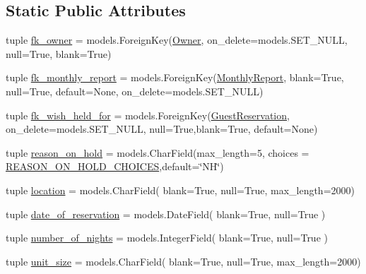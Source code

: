 \subsection*{Static Public Attributes}
\begin{DoxyCompactItemize}
\item 
tuple \hyperlink{classreservation__manager_1_1models_1_1Reservation_ad460f0ba3d784f28324085882a2246b8}{fk\-\_\-owner} = models.\-Foreign\-Key(\hyperlink{classreservation__manager_1_1models_1_1Owner}{Owner}, on\-\_\-delete=models.\-S\-E\-T\-\_\-\-N\-U\-L\-L, null=True, blank=True)
\item 
tuple \hyperlink{classreservation__manager_1_1models_1_1Reservation_ac21f0b3528f8e3ba53c3e24231a303cc}{fk\-\_\-monthly\-\_\-report} = models.\-Foreign\-Key(\hyperlink{classmonthly__summary_1_1models_1_1MonthlyReport}{Monthly\-Report}, blank=True, null=True, default=None, on\-\_\-delete=models.\-S\-E\-T\-\_\-\-N\-U\-L\-L)
\item 
tuple \hyperlink{classreservation__manager_1_1models_1_1Reservation_a0fc4a0b1a628c9d2eadbe57632be4387}{fk\-\_\-wish\-\_\-held\-\_\-for} = models.\-Foreign\-Key(\hyperlink{classguest__reservation__manager_1_1models_1_1GuestReservation}{Guest\-Reservation}, on\-\_\-delete=models.\-S\-E\-T\-\_\-\-N\-U\-L\-L, null=True,blank=True, default=None)
\item 
tuple \hyperlink{classreservation__manager_1_1models_1_1Reservation_a05bba6cb6791c1aadf552795174c1be7}{reason\-\_\-on\-\_\-hold} = models.\-Char\-Field(max\-\_\-length=5, choices = \hyperlink{namespacereservation__manager_1_1models_a435b3782f874d82dd97276b49043592c}{R\-E\-A\-S\-O\-N\-\_\-\-O\-N\-\_\-\-H\-O\-L\-D\-\_\-\-C\-H\-O\-I\-C\-E\-S},default=\char`\"{}N\-H\char`\"{})
\item 
tuple \hyperlink{classreservation__manager_1_1models_1_1Reservation_a6a4c731b0619aaddc2c712a28388257a}{location} = models.\-Char\-Field( blank=True, null=True, max\-\_\-length=2000)
\item 
tuple \hyperlink{classreservation__manager_1_1models_1_1Reservation_a25c61b7deefe701dcfc4db65f134875d}{date\-\_\-of\-\_\-reservation} = models.\-Date\-Field( blank=True, null=True )
\item 
tuple \hyperlink{classreservation__manager_1_1models_1_1Reservation_a3545295be618596339a711e39cd97db4}{number\-\_\-of\-\_\-nights} = models.\-Integer\-Field( blank=True, null=True )
\item 
tuple \hyperlink{classreservation__manager_1_1models_1_1Reservation_ac1fd20bad3887df3154f1304ddb19082}{unit\-\_\-size} = models.\-Char\-Field( blank=True, null=True, max\-\_\-length=2000)

\end{DoxyCompactItemize}
